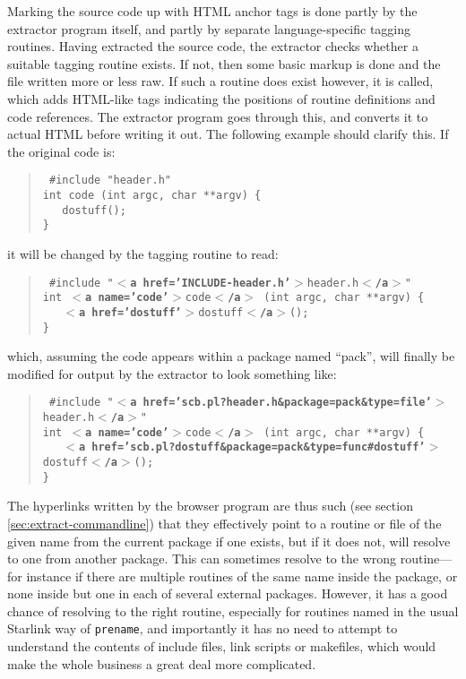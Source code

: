 \documentclass[twoside,11pt]{article}
\renewcommand{\_}{\texttt{\symbol{95}}}
\begin{document}
Marking the source code up with HTML anchor tags 
is done partly by the extractor program itself, 
and partly by separate language-specific tagging routines.
Having extracted the source code, the extractor 
checks whether a suitable tagging routine exists. 
If not, then some basic markup is done and the file written 
more or less raw.
If such a routine does exist however, it is called, 
which adds
HTML-like tags indicating the positions of routine definitions 
and code references.
The extractor program goes through this, and converts it to 
actual HTML before writing it out.
The following example should clarify this.  
If the original code is:
%
%
\begin{quote}
{\tt
\#include "header.h" \\
int code (int argc, char **argv) \{ \\
\mbox{}~~~do\_stuff(); \\
\}
}
\end{quote}
it will be changed by the tagging routine to read:
\begin{quote}
{\tt
\#include "{\bf $<$a href='INCLUDE-header.h'$>$}header.h{\bf $<$/a$>$}" \\
int {\bf $<$a name='code'$>$}code{\bf $<$/a$>$} (int argc, char **argv) \{ \\
\mbox{}~~~{\bf $<$a href='do\_stuff'$>$}do\_stuff{\bf $<$/a$>$}(); \\
\}
}
\end{quote}
which, assuming the code appears within a package named ``pack'', 
will finally be modified for output by the extractor to look something like:
\begin{quote}
{\tt
\#include "{\bf $<$a href='scb.pl?header.h\&package=pack\&type=file'$>$}header.h{\bf $<$/a$>$}" \\
int {\bf $<$a name='code'$>$}code{\bf $<$/a$>$} (int argc, char **argv) \{ \\
\mbox{}~~~{\bf $<$a~href='scb.pl?do\_stuff\&package=pack\&type=func\#do\_stuff'$>$}do\_stuff{\bf $<$/a$>$}(); \\
\}
}
\end{quote}
The hyperlinks written by the browser program are thus such
(see section \ref{sec:extract-commandline})
that they effectively point to a routine or file of the given name from
the current package if one exists, but if it does not, will resolve to
one from another package.
This can sometimes resolve to the wrong routine---for instance
if there are multiple routines of the same name inside the
package, or none inside but one in each of several external packages.
However, it has a good chance of resolving to the right routine,
especially for routines named in the usual Starlink way of
{\tt pre\_name}, and importantly it has no need to attempt to 
understand the contents of include files, link scripts or makefiles, which 
would make the whole business a great deal more complicated.
\end{document}
